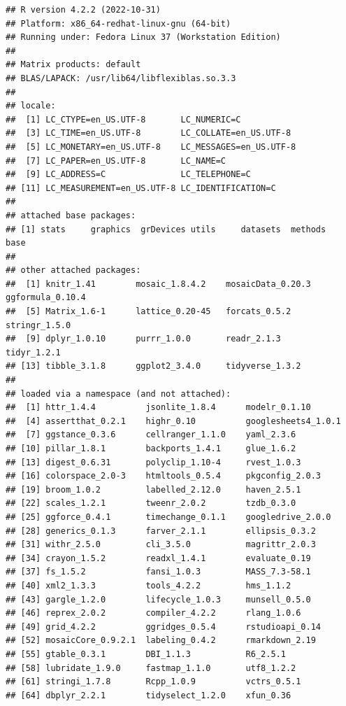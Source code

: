 \documentclass[
  10pt,
]{article}
\begin{document}
\begin{verbatim}
## R version 4.2.2 (2022-10-31)
## Platform: x86_64-redhat-linux-gnu (64-bit)
## Running under: Fedora Linux 37 (Workstation Edition)
## 
## Matrix products: default
## BLAS/LAPACK: /usr/lib64/libflexiblas.so.3.3
## 
## locale:
##  [1] LC_CTYPE=en_US.UTF-8       LC_NUMERIC=C              
##  [3] LC_TIME=en_US.UTF-8        LC_COLLATE=en_US.UTF-8    
##  [5] LC_MONETARY=en_US.UTF-8    LC_MESSAGES=en_US.UTF-8   
##  [7] LC_PAPER=en_US.UTF-8       LC_NAME=C                 
##  [9] LC_ADDRESS=C               LC_TELEPHONE=C            
## [11] LC_MEASUREMENT=en_US.UTF-8 LC_IDENTIFICATION=C       
## 
## attached base packages:
## [1] stats     graphics  grDevices utils     datasets  methods   base     
## 
## other attached packages:
##  [1] knitr_1.41        mosaic_1.8.4.2    mosaicData_0.20.3 ggformula_0.10.4 
##  [5] Matrix_1.6-1      lattice_0.20-45   forcats_0.5.2     stringr_1.5.0    
##  [9] dplyr_1.0.10      purrr_1.0.0       readr_2.1.3       tidyr_1.2.1      
## [13] tibble_3.1.8      ggplot2_3.4.0     tidyverse_1.3.2  
## 
## loaded via a namespace (and not attached):
##  [1] httr_1.4.4          jsonlite_1.8.4      modelr_0.1.10      
##  [4] assertthat_0.2.1    highr_0.10          googlesheets4_1.0.1
##  [7] ggstance_0.3.6      cellranger_1.1.0    yaml_2.3.6         
## [10] pillar_1.8.1        backports_1.4.1     glue_1.6.2         
## [13] digest_0.6.31       polyclip_1.10-4     rvest_1.0.3        
## [16] colorspace_2.0-3    htmltools_0.5.4     pkgconfig_2.0.3    
## [19] broom_1.0.2         labelled_2.12.0     haven_2.5.1        
## [22] scales_1.2.1        tweenr_2.0.2        tzdb_0.3.0         
## [25] ggforce_0.4.1       timechange_0.1.1    googledrive_2.0.0  
## [28] generics_0.1.3      farver_2.1.1        ellipsis_0.3.2     
## [31] withr_2.5.0         cli_3.5.0           magrittr_2.0.3     
## [34] crayon_1.5.2        readxl_1.4.1        evaluate_0.19      
## [37] fs_1.5.2            fansi_1.0.3         MASS_7.3-58.1      
## [40] xml2_1.3.3          tools_4.2.2         hms_1.1.2          
## [43] gargle_1.2.0        lifecycle_1.0.3     munsell_0.5.0      
## [46] reprex_2.0.2        compiler_4.2.2      rlang_1.0.6        
## [49] grid_4.2.2          ggridges_0.5.4      rstudioapi_0.14    
## [52] mosaicCore_0.9.2.1  labeling_0.4.2      rmarkdown_2.19     
## [55] gtable_0.3.1        DBI_1.1.3           R6_2.5.1           
## [58] lubridate_1.9.0     fastmap_1.1.0       utf8_1.2.2         
## [61] stringi_1.7.8       Rcpp_1.0.9          vctrs_0.5.1        
## [64] dbplyr_2.2.1        tidyselect_1.2.0    xfun_0.36
\end{verbatim}
\end{document}
